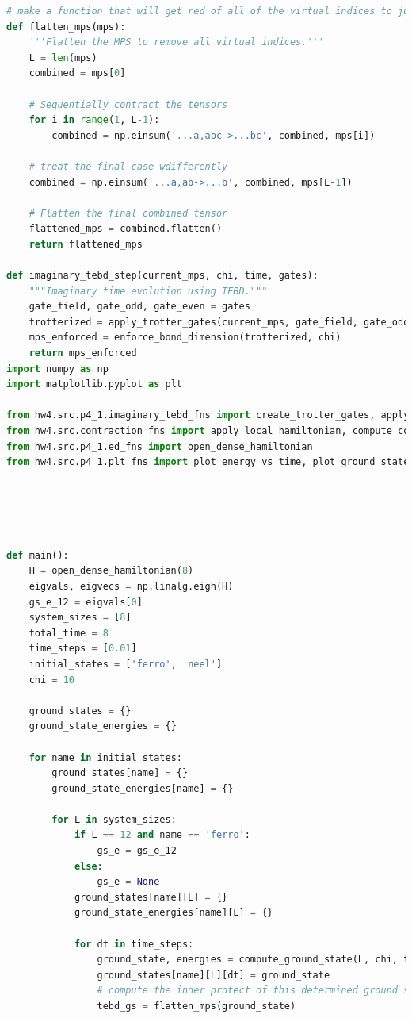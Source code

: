 \documentclass[12pt]{article}
\begin{document}
\begin{lstlisting}[language=Python]
# make a function that will get red of all of the virtual indices to just leave the physical indices of an mps
def flatten_mps(mps):
    '''Flatten the MPS to remove all virtual indices.'''
    L = len(mps)
    combined = mps[0]

    # Sequentially contract the tensors
    for i in range(1, L-1):
        combined = np.einsum('...a,abc->...bc', combined, mps[i])

    # treat the final case wdifferently
    combined = np.einsum('...a,ab->...b', combined, mps[L-1])

    # Flatten the final combined tensor
    flattened_mps = combined.flatten()
    return flattened_mps

def imaginary_tebd_step(current_mps, chi, time, gates):
    """Imaginary time evolution using TEBD."""
    gate_field, gate_odd, gate_even = gates
    trotterized = apply_trotter_gates(current_mps, gate_field, gate_odd, gate_even)
    mps_enforced = enforce_bond_dimension(trotterized, chi)
    return mps_enforced
import numpy as np
import matplotlib.pyplot as plt

from hw4.src.p4_1.imaginary_tebd_fns import create_trotter_gates, apply_trotter_gates, enforce_bond_dimension, create_initial_mps, flatten_mps
from hw4.src.contraction_fns import apply_local_hamiltonian, compute_contraction
from hw4.src.p4_1.ed_fns import open_dense_hamiltonian
from hw4.src.p4_1.plt_fns import plot_energy_vs_time, plot_ground_state_density, get_correlations, plot_correlations





def main():
    H = open_dense_hamiltonian(8)
    eigvals, eigvecs = np.linalg.eigh(H)
    gs_e_12 = eigvals[0]
    system_sizes = [8]
    total_time = 8
    time_steps = [0.01]
    initial_states = ['ferro', 'neel']
    chi = 10

    ground_states = {}
    ground_state_energies = {}

    for name in initial_states:
        ground_states[name] = {}
        ground_state_energies[name] = {}
        
        for L in system_sizes:
            if L == 12 and name == 'ferro':
                gs_e = gs_e_12
            else:
                gs_e = None
            ground_states[name][L] = {}
            ground_state_energies[name][L] = {}
            
            for dt in time_steps:
                ground_state, energies = compute_ground_state(L, chi, total_time, dt, name)
                ground_states[name][L][dt] = ground_state
                # compute the inner protect of this determined ground state with the true one from ed
                tebd_gs = flatten_mps(ground_state)
                

\end{lstlisting}
\end{document}
